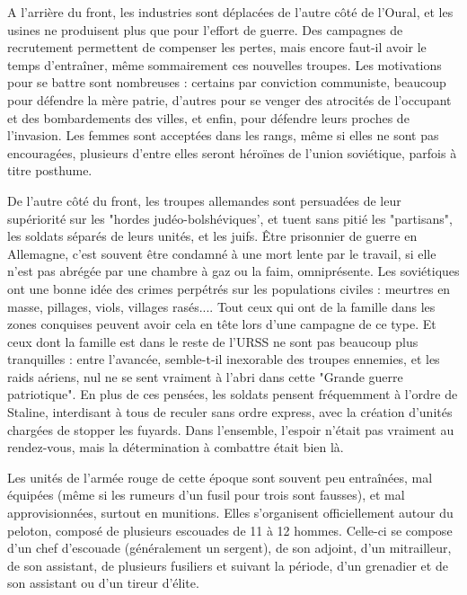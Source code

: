 \documentclass{report}
\begin{document}
\begin{multicols}{2}
A l'arrière du front, les industries sont déplacées de l'autre côté de l'Oural, et les usines ne produisent plus que pour l'effort de guerre. Des campagnes de recrutement permettent de compenser les pertes, mais encore faut-il avoir le temps d'entraîner, même sommairement ces nouvelles troupes. Les motivations pour se battre sont nombreuses : certains par conviction communiste, beaucoup pour défendre la mère patrie, d'autres pour se venger des atrocités de l'occupant et des bombardements des villes, et enfin, pour défendre leurs proches de l'invasion. Les femmes sont acceptées dans les rangs, même si elles ne sont pas encouragées, plusieurs d'entre elles seront héroïnes de l'union soviétique, parfois à titre posthume.

De l'autre côté du front, les troupes allemandes sont persuadées de leur supériorité sur les "hordes judéo-bolshéviques', et tuent sans pitié les "partisans", les soldats séparés de leurs unités, et les juifs. Être prisonnier de guerre en Allemagne, c'est souvent être condamné à une mort lente par le travail, si elle n'est pas abrégée par une chambre à gaz ou la faim, omniprésente. Les soviétiques ont une bonne idée des crimes perpétrés sur les populations civiles : meurtres en masse, pillages, viols, villages rasés.... Tout ceux qui ont de la famille dans les zones conquises peuvent avoir cela en tête lors d'une campagne de ce type. Et ceux dont la famille est dans le reste de l'URSS ne sont pas beaucoup plus tranquilles : entre l'avancée, semble-t-il inexorable des troupes ennemies, et les raids aériens, nul ne se sent vraiment à l'abri dans cette "Grande guerre patriotique". En plus de ces pensées, les soldats pensent fréquemment à l'ordre de Staline, interdisant à tous de reculer sans ordre express, avec la création d'unités chargées de stopper les fuyards. Dans l'ensemble, l'espoir n'était pas vraiment au rendez-vous, mais la détermination à combattre était bien là.

Les unités de l'armée rouge de cette époque sont souvent peu entraînées, mal équipées (même si les rumeurs d'un fusil pour trois sont fausses), et mal approvisionnées, surtout en munitions. Elles s'organisent officiellement autour du peloton, composé de plusieurs escouades de 11 à 12 hommes. Celle-ci se compose d'un chef d'escouade (généralement un sergent), de son adjoint, d'un mitrailleur, de son assistant, de plusieurs fusiliers et suivant la période, d'un grenadier et de son assistant ou d'un tireur d'élite.


\end{multicols}
\end{document}
